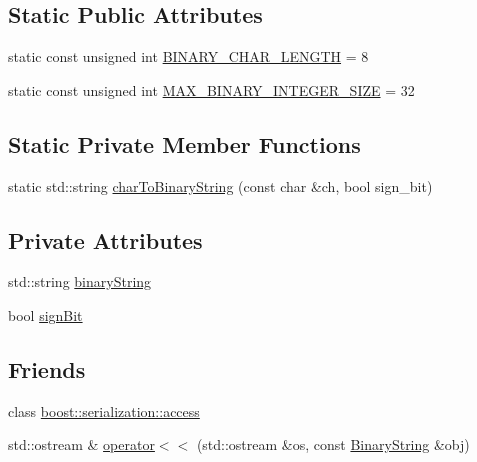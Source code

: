 \subsection*{\-Static \-Public \-Attributes}
\begin{DoxyCompactItemize}
\item 
static const unsigned int \hyperlink{classcryomesh_1_1state_1_1BinaryString_aa4d7d35e5b93d290dfe6f1bafa0e0cc2}{\-B\-I\-N\-A\-R\-Y\-\_\-\-C\-H\-A\-R\-\_\-\-L\-E\-N\-G\-T\-H} = 8
\item 
static const unsigned int \hyperlink{classcryomesh_1_1state_1_1BinaryString_abd1c70d0aef65ad2ba5af998a22b01ab}{\-M\-A\-X\-\_\-\-B\-I\-N\-A\-R\-Y\-\_\-\-I\-N\-T\-E\-G\-E\-R\-\_\-\-S\-I\-Z\-E} = 32
\end{DoxyCompactItemize}
\subsection*{\-Static \-Private \-Member \-Functions}
\begin{DoxyCompactItemize}
\item 
static std\-::string \hyperlink{classcryomesh_1_1state_1_1BinaryString_af3b1fbe76e1adf6428bbe60a393cc1df}{char\-To\-Binary\-String} (const char \&ch, bool sign\-\_\-bit)
\end{DoxyCompactItemize}
\subsection*{\-Private \-Attributes}
\begin{DoxyCompactItemize}
\item 
std\-::string \hyperlink{classcryomesh_1_1state_1_1BinaryString_ad125f434a2cb9693597aa8be05217d21}{binary\-String}
\item 
bool \hyperlink{classcryomesh_1_1state_1_1BinaryString_a82a7189edccf834f144e4717294bb505}{sign\-Bit}
\end{DoxyCompactItemize}
\subsection*{\-Friends}
\begin{DoxyCompactItemize}
\item 
class \hyperlink{classcryomesh_1_1state_1_1BinaryString_ac98d07dd8f7b70e16ccb9a01abf56b9c}{boost\-::serialization\-::access}
\item 
std\-::ostream \& \hyperlink{classcryomesh_1_1state_1_1BinaryString_a734cab800f1e57aca6285cdcac48180d}{operator$<$$<$} (std\-::ostream \&os, const \hyperlink{classcryomesh_1_1state_1_1BinaryString}{\-Binary\-String} \&obj)
\end{DoxyCompactItemize}


